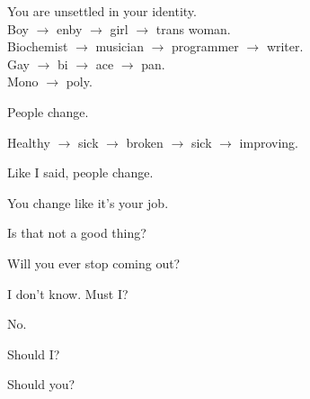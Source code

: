 \begin{paracol}{2}
  \begin{leftcolumn}

\begin{ally}
You are unsettled in your identity.\\
Boy $\rightarrow$ enby $\rightarrow$ girl $\rightarrow$ trans woman.\\
Biochemist $\rightarrow$ musician $\rightarrow$ programmer $\rightarrow$ writer.\\
Gay $\rightarrow$ bi $\rightarrow$ ace $\rightarrow$ pan.\\
Mono $\rightarrow$ poly.
\end{ally}
People change.

\begin{ally}
Healthy $\rightarrow$ sick $\rightarrow$ broken $\rightarrow$ sick $\rightarrow$ improving.
\end{ally}
Like I said, people change.

\begin{ally}
You change like it's your job.
\end{ally}
Is that not a good thing?

\begin{ally}
Will you ever stop coming out?
\end{ally}
I don't know. Must I?

\begin{ally}
No.
\end{ally}
Should I?

\begin{ally}
Should you?
\end{ally}
\newpage

\end{leftcolumn}
\end{paracol}
